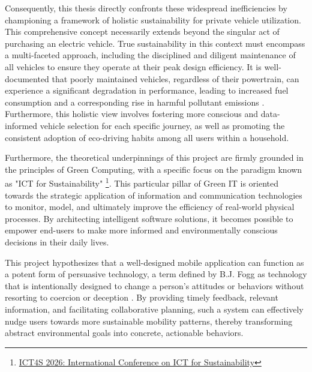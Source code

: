 \textgap

Consequently, this thesis directly confronts these widespread inefficiencies by championing a framework of holistic sustainability for private vehicle utilization. This comprehensive concept necessarily extends beyond the singular act of purchasing an electric vehicle. True sustainability in this context must encompass a multi-faceted approach, including the disciplined and diligent maintenance of all vehicles to ensure they operate at their peak design efficiency. It is well-documented that poorly maintained vehicles, regardless of their powertrain, can experience a significant degradation in performance, leading to increased fuel consumption and a corresponding rise in harmful pollutant emissions \cite{iea2021fuel}. Furthermore, this holistic view involves fostering more conscious and data-informed vehicle selection for each specific journey, as well as promoting the consistent adoption of eco-driving habits among all users within a household.

\textgap

Furthermore, the theoretical underpinnings of this project are firmly grounded in the principles of Green Computing, with a specific focus on the paradigm known as "ICT for Sustainability" \footnote{\href{https://conf.researchr.org/home/ict4s-2026}{ICT4S 2026: International Conference on ICT for Sustainability}}. This particular pillar of Green IT is oriented towards the strategic application of information and communication technologies to monitor, model, and ultimately improve the efficiency of real-world physical processes. By architecting intelligent software solutions, it becomes possible to empower end-users to make more informed and environmentally conscious decisions in their daily lives. 


\textgap

This project hypothesizes that a well-designed mobile application can function as a potent form of persuasive technology, a term defined by B.J. Fogg as technology that is intentionally designed to change a person's attitudes or behaviors without resorting to coercion or deception \cite{fogg2002persuasive}. By providing timely feedback, relevant information, and facilitating collaborative planning, such a system can effectively nudge users towards more sustainable mobility patterns, thereby transforming abstract environmental goals into concrete, actionable behaviors.

